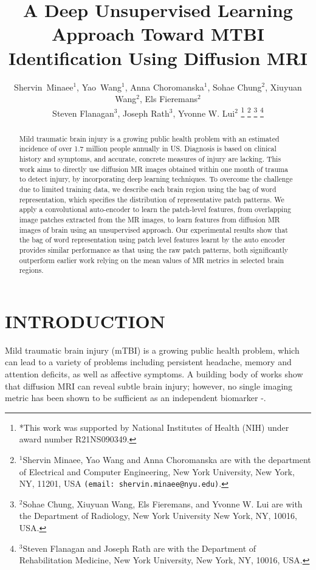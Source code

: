 \documentclass[letterpaper, 10 pt, conference]{ieeeconf}  %
\title{\LARGE \bf
A Deep Unsupervised Learning Approach Toward MTBI Identification Using Diffusion MRI}
\author{Shervin~Minaee$^{1}$,  Yao~Wang$^1$, Anna Choromanska$^1$, Sohae Chung$^2$, Xiuyuan Wang$^2$, Els Fieremans$^2$ \\
Steven Flanagan$^3$, Joseph Rath$^3$, Yvonne W. Lui$^2$%
\thanks{*This work was supported by  National Institutes of Health (NIH) under award number  R21NS090349.}%
\thanks{$^{1}$Shervin Minaee, Yao Wang and Anna Choromanska are with the department of Electrical and Computer Engineering, New York University, New York, NY, 11201, USA
        {\tt\small (email:\ shervin.minaee@nyu.edu)}.} %
\thanks{$^{2}$Sohae Chung, Xiuyuan Wang, Els Fieremans, and Yvonne W. Lui are with the Department of Radiology, New York University
        New York, NY, 10016, USA.
       }
\thanks{$^{3}$Steven Flanagan and Joseph Rath are with the Department of Rehabilitation Medicine, New York University, New York, NY, 10016, USA.
       }
}
\begin{document}
\maketitle
\thispagestyle{empty}
\pagestyle{empty}


\begin{abstract}
Mild traumatic brain injury is a growing public health problem with an estimated incidence of over 1.7 million people annually in US. 
Diagnosis is based on clinical history and symptoms, and accurate, concrete measures of injury are lacking.
This work aims to directly use diffusion MR images obtained within one month of trauma to detect injury, by incorporating deep learning techniques.
To overcome the challenge due to limited training data,  we describe each brain region using the bag of word representation, which specifies  the distribution of representative patch patterns. 
We apply a convolutional auto-encoder to learn  the patch-level features, from overlapping image patches extracted from the MR images,  to learn features from  diffusion MR images of brain using an unsupervised approach.
Our experimental results show that the bag of word representation using  patch level features learnt by the auto encoder provides similar performance as that using the raw patch patterns, both significantly outperform earlier work relying on the mean values of MR metrics in selected brain regions.
\end{abstract}


\section{INTRODUCTION}
Mild traumatic brain injury (mTBI) is a growing public health problem, which can lead to a variety of problems including persistent headache, memory and attention deficits, as well as affective symptoms.
A building body of works show that diffusion MRI can reveal subtle brain injury; however, no single imaging metric has been shown to be sufficient as an independent biomarker \cite{lui3}-\cite{lui5}.
\end{document}
